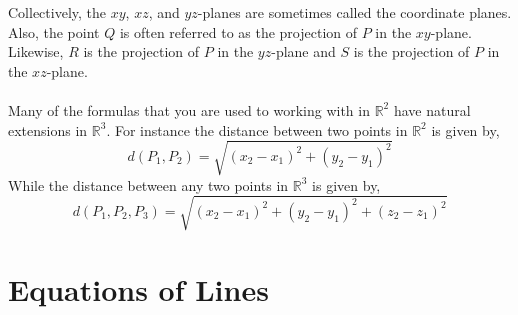 \documentclass[10pt,reqno]{book}
\theoremstyle{definition}
\def\R{\mathbb{R}}
\begin{document}
	Collectively, the $ xy $, $ xz $, and $ yz $-planes are sometimes called the coordinate planes. Also, the point $ Q $ is often referred to as the projection of $ P $ in the $ xy $-plane. Likewise, $ R $ is the projection of $ P $ in the $ yz $-plane and $ S $ is the projection of $ P $ in the $ xz $-plane.\\ \\
	Many of the formulas that you are used to working with in $ \R^2 $  have natural extensions in $ \R^3 $. For instance the distance between two points in $ \R^2 $ is given by,
	\[ d(P_1,P_2) = \sqrt{(x_2-x_1)^2+(y_2-y_1)^2} \]
	While the distance between any two points in $ \R^3 $ is given by,
	\[ d(P_1,P_2,P_3) = \sqrt{(x_2-x_1)^2+(y_2-y_1)^2+(z_2-z_1)^2} \]
	
	\section{Equations of Lines}
	
\end{document}
